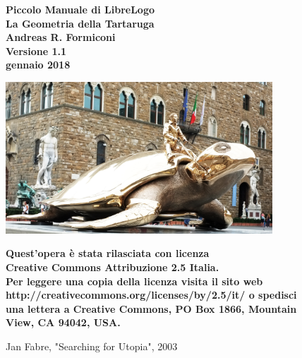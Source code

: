 \begin{titlepage}



\begin{figure}
   \centering

\vfill
{\bfseries\huge
   Piccolo Manuale di LibreLogo\\
   \vskip5mm \Large
   La Geometria della Tartaruga\\
   \vskip2cm
   \large
   Andreas R. Formiconi\\
   \vskip8mm
   \normalsize 
   Versione 1.1\\
   \vskip4mm
   gennaio 2018
   \vskip2cm
}    
\vfill

   \includegraphics[width=10.0cm]{./images/frontespizio/utopia.jpg}
   \caption{Jan Fabre, "Searching for Utopia", 2003} 
   \label{utopia}


\vfill
{\bfseries \vskip4cm \footnotesize 
Quest'opera è stata rilasciata con licenza 
\\Creative Commons Attribuzione 2.5 Italia. 
\\Per leggere una copia della licenza visita il sito web http://creativecommons.org/licenses/by/2.5/it/ o spedisci una lettera a Creative Commons, PO Box 1866, Mountain View, CA 94042, USA.\\
}    
\vfill

\end{figure}

\end{titlepage}

